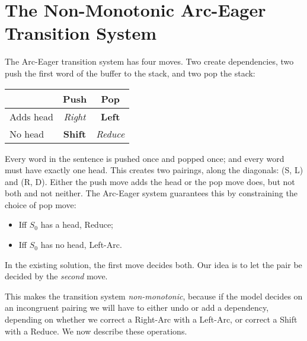 \documentclass[11pt,letterpaper]{article}
\begin{document}
\section{The Non-Monotonic Arc-Eager Transition System}

The Arc-Eager transition system \citep{nivre:04} has four moves. Two create 
dependencies, two push the first word of the buffer to the stack, and two pop 
the stack:

\begin{center}
    \begin{tabular}{l|cc}
             & Push  & Pop    \\
           \hline
           Adds head   & \emph{Right} & \textbf{Left}    \\
            No head    & \textbf{Shift} & \emph{Reduce}   \\
     \end{tabular}
\end{center}

Every word in the sentence is pushed once and popped once; and every
word must have exactly one head. This creates two pairings, along the
diagonals: (S, L) and (R, D).
Either the push move adds the head or the pop move does, but not both and not neither.
The Arc-Eager system guarantees this by constraining the choice of pop move:

\begin{itemize}\setlength{\itemsep}{-2mm}
    \item Iff $S_0$ has a head, Reduce;
    \item Iff $S_0$ has no head, Left-Arc.
\end{itemize}
In the existing solution, the first move decides both.
Our idea is to let the pair be decided by the \emph{second} move.

This makes the transition system \emph{non-monotonic}, because if the model decides
on an incongruent pairing
we will have to either undo or add a
dependency, depending on whether we correct a Right-Arc with a Left-Arc, or correct
a Shift with a Reduce. We now describe these operations.
\end{document}
